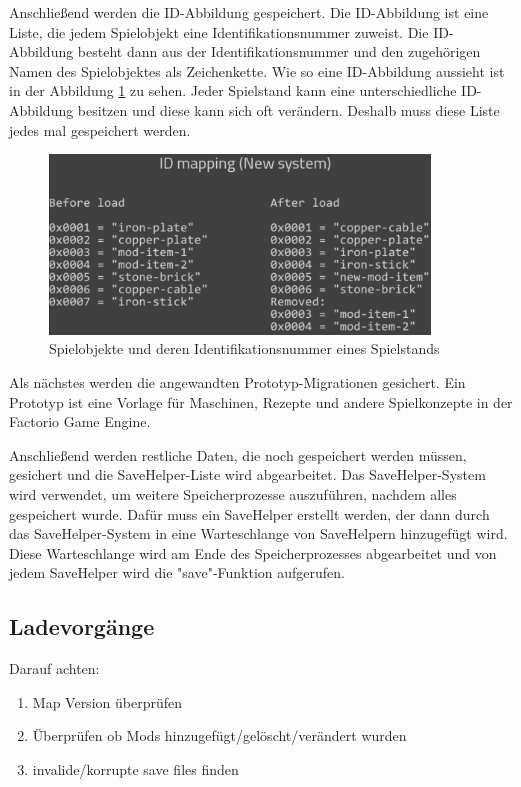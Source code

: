 Anschließend werden die ID-Abbildung gespeichert.\cite{factorioGithubSaveLoad} Die ID-Abbildung ist eine Liste, die jedem Spielobjekt eine Identifikationsnummer zuweist. Die ID-Abbildung besteht dann aus der Identifikationsnummer und den zugehörigen Namen des Spielobjektes als Zeichenkette. Wie so eine ID-Abbildung aussieht ist in der Abbildung \ref{fig:factorioIdMapping} zu sehen. Jeder Spielstand kann eine unterschiedliche ID-Abbildung besitzen und diese kann sich oft verändern. Deshalb muss diese Liste jedes mal gespeichert werden.\cite{factorioFridayFacts259}

\begin{figure}[htp]
    \centering
    \includegraphics[width=0.9\textwidth]{images/id_mapping_factorio.png}
    \caption{Spielobjekte und deren Identifikationsnummer eines Spielstands\cite{factorioFridayFacts259}}
    \label{fig:factorioIdMapping}
\end{figure}

Als nächstes werden die angewandten Prototyp-Migrationen gesichert.\cite{factorioGithubSaveLoad} Ein Prototyp ist eine Vorlage für Maschinen, Rezepte und andere Spielkonzepte in der Factorio Game Engine.\cite{factorioPrototypesDocs}

Anschließend werden restliche Daten, die noch gespeichert werden müssen, gesichert und die SaveHelper-Liste wird abgearbeitet. Das SaveHelper-System wird verwendet, um weitere Speicherprozesse auszuführen, nachdem alles gespeichert wurde. Dafür muss ein SaveHelper erstellt werden, der dann durch das SaveHelper-System in eine Warteschlange von SaveHelpern hinzugefügt wird. Diese Warteschlange wird am Ende des Speicherprozesses abgearbeitet und von jedem SaveHelper wird die "save"-Funktion aufgerufen.\cite{factorioGithubSaveLoad}



\subsection{Ladevorgänge}
Darauf achten:
\begin{enumerate}
    \item Map Version überprüfen
    \item Überprüfen ob Mods hinzugefügt/gelöscht/verändert wurden
    \item invalide/korrupte save files finden 
\end{enumerate}

